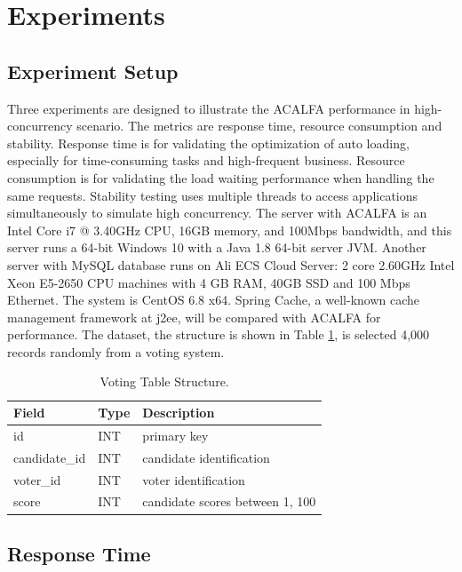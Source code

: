 \documentclass{singlecol-new}
\theoremstyle{TH}{
\newtheorem{lemma}{Lemma}
\newtheorem{theorem}[lemma]{Theorem}
\newtheorem{corrolary}[lemma]{Corrolary}
\newtheorem{conjecture}[lemma]{Conjecture}
\newtheorem{proposition}[lemma]{Proposition}
\newtheorem{claim}[lemma]{Claim}
\newtheorem{stheorem}[lemma]{Wrong Theorem}
}
\theoremstyle{THrm}{
\newtheorem{definition}{Definition}[section]
\newtheorem{question}{Question}[section]
\newtheorem{remark}{Remark}
\newtheorem{scheme}{Scheme}
}
\theoremstyle{THhit}{
\newtheorem{case}{Case}[section]
}
\begin{document}
\section{Experiments}
\label{Experiments}

\subsection{Experiment Setup}
Three experiments are designed to illustrate the ACALFA performance in high-concurrency scenario. The metrics are response time, resource consumption and stability. Response time is for validating the optimization of auto loading, especially for time-consuming tasks and high-frequent business. Resource consumption is for validating the load waiting performance when handling the same requests. Stability testing uses multiple threads to access applications simultaneously to simulate high concurrency. The server with ACALFA is an Intel Core i7 @ 3.40GHz CPU, 16GB memory, and 100Mbps bandwidth, and this server runs a 64-bit Windows 10 with a Java 1.8 64-bit server JVM. Another server with MySQL database runs on Ali ECS Cloud Server: 2 core 2.60GHz Intel Xeon E5-2650 CPU machines with 4 GB RAM, 40GB SSD and 100 Mbps Ethernet. The system is CentOS 6.8 x64. Spring Cache, a well-known cache management framework at j2ee, will be compared with ACALFA for performance. The dataset, the structure is shown in Table \ref{VTS}, is selected 4,000 records randomly from a voting system.

\begin{table}[htb]
\begin{center}
 \caption{\label{VTS}Voting Table Structure.}
 \begin{tabular}{lll}
 \toprule
    Field & Type & Description\\
 \midrule
    id & INT & primary key\\
    candidate\_id & INT & candidate identification\\
    voter\_id & INT & voter identification\\
    score & INT & candidate scores between 1, 100\\
\bottomrule
 \end{tabular}
\end{center}
\end{table}

\subsection{Response Time}
\end{document}
